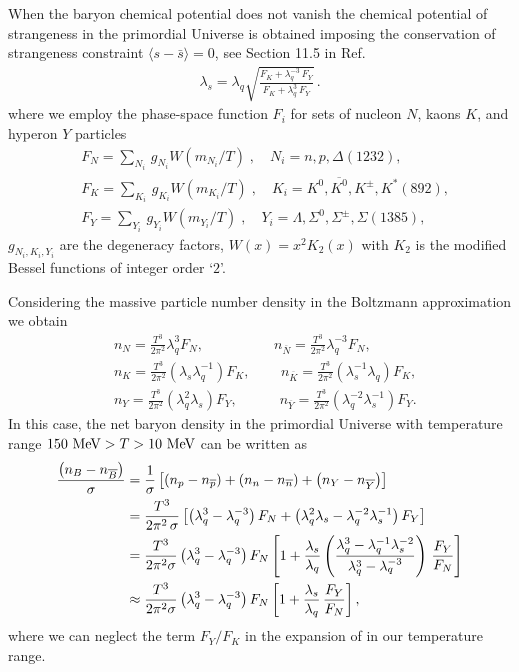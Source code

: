 When the baryon chemical potential does not vanish the chemical potential of strangeness in the primordial Universe is obtained imposing the conservation of strangeness constraint $\langle s-\bar s \rangle=0$, see Section 11.5 in Ref.\,\cite{Letessier:2002ony}
\begin{align}\label{museq}
\lambda_s=\lambda_q\sqrt{\frac{F_K+\lambda^{-3}_q\,F_Y}{F_K+\lambda^3_q\,F_Y}}\,.
\end{align}
where we employ the phase-space function $F_i$ for sets of nucleon $N$, kaons $K$, and hyperon $Y$ particles 
\begin{align}
&F_N=\sum_{N_i}\,g_{N_i}W(m_{N_i}/T)\;, \quad N_i=n, p, \Delta(1232),\\
&F_K=\sum_{K_i}\,g_{K_i}W(m_{K_i}/T)\;, \quad K_i=K^0, \overline{K^0}, K^\pm, K^\ast(892),\\
&F_Y=\sum_{Y_i}\,g_{Y_i}W(m_{Y_i}/T)\;, \quad Y_i=\Lambda, \Sigma^0,\Sigma^\pm, \Sigma(1385),
\end{align}
$g_{N_i,K_i,Y_i}$ are the degeneracy factors, $W(x)=x^2K_2(x)$ with $K_2$ is the modified Bessel functions of integer order `$2$'. 

Considering the massive particle number density in the Boltzmann approximation we obtain
\begin{align}
\label{Density_N}
&n_N=\frac{T^3}{2\pi^2}\lambda_q^3F_N,\quad\qquad\qquad n_{\overline N}=\frac{T^3}{2\pi^2}\lambda^{-3}_qF_N,\\
\label{Density_K}
&n_K=\frac{T^3}{2\pi^2}\left(\lambda_s\lambda_q^{-1}\right)F_K,\,\qquad n_{\overline{K}}=\frac{T^3}{2\pi^2}\left(\lambda_s^{-1}\lambda_q\right)F_K,\\
\label{Density_Y}
&n_Y=\frac{T^3}{2\pi^2}\left(\lambda_q^2\lambda_s\right)F_Y,\quad\qquad n_{\overline Y}=\frac{T^3}{2\pi^2}\left(\lambda^{-2}_q\lambda_s^{-1}\right)F_Y.
\end{align}
In this case, the net baryon density in the primordial Universe with temperature range $150\text{ MeV}> T>10\text{ MeV}$ can be written as 
\begin{align}
\frac{\left(n_B-n_{\overline{B}}\right)}{\sigma}&=\frac{1}{\sigma}\left[\left(n_p-n_{\overline{p}}\right)+\left(n_n-n_{\overline{n}}\right)+\left(n_Y-n_{\overline{Y}}\right)\right]\notag\\
&=\frac{T^3}{2\pi^2\,\sigma}\left[\left(\lambda_q^3-\lambda^{-3}_q\right)F_N+\left(\lambda_q^2\lambda_s-\lambda^{-2}_q\lambda_s^{-1}\right)F_Y\right]\notag\\
&=\frac{T^3}{2\pi^2\sigma}\left(\lambda_q^3-\lambda_q^{-3}\right)F_N\left[1+\frac{\lambda_s}{\lambda_q}\left(\frac{\lambda_q^3-\lambda^{-1}_q\lambda_s^{-2}}{\lambda^3_q-\lambda^{-3}_q}\right)\,\frac{F_Y}{F_N}\right]\notag\\
&\approx\frac{T^3}{2\pi^2\sigma}\left(\lambda_q^3-\lambda_q^{-3}\right)F_N\left[1+\frac{\lambda_s}{\lambda_q}\,\frac{F_Y}{F_N}\right],
\end{align}
where we can neglect the term $F_Y/F_K$ in the expansion of  in our temperature range. 

